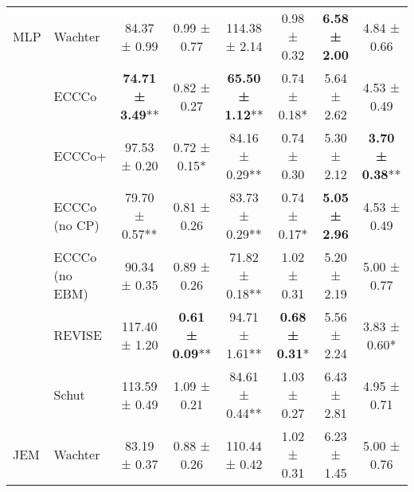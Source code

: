 \begin{table*}[t]
{\begin{tabular}[t]{llcccccc}
\multirow{-7}{*}{\raggedright\arraybackslash MLP} & Wachter & 84.37 ± 0.99\hphantom{*}\hphantom{*} & 0.99 ± 0.77\hphantom{*}\hphantom{*} & 114.38 ± 2.14\hphantom{*}\hphantom{*} & 0.98 ± 0.32\hphantom{*}\hphantom{*} & \textbf{6.58 ± 2.00}\hphantom{*}\hphantom{*} & 4.84 ± 0.66\hphantom{*}\hphantom{*}\\
\cmidrule{1-8}
 & ECCCo & \textbf{74.71 ± 3.49}** & 0.82 ± 0.27\hphantom{*}\hphantom{*} & \textbf{65.50 ± 1.12}** & 0.74 ± 0.18*\hphantom{*} & 5.64 ± 2.62\hphantom{*}\hphantom{*} & 4.53 ± 0.49\hphantom{*}\hphantom{*}\\

 & ECCCo+ & 97.53 ± 0.20\hphantom{*}\hphantom{*} & 0.72 ± 0.15*\hphantom{*} & 84.16 ± 0.29** & 0.74 ± 0.30\hphantom{*}\hphantom{*} & 5.30 ± 2.12\hphantom{*}\hphantom{*} & \textbf{3.70 ± 0.38}**\\

 & ECCCo (no CP) & 79.70 ± 0.57** & 0.81 ± 0.26\hphantom{*}\hphantom{*} & 83.73 ± 0.29** & 0.74 ± 0.17*\hphantom{*} & \textbf{5.05 ± 2.96}\hphantom{*}\hphantom{*} & 4.53 ± 0.49\hphantom{*}\hphantom{*}\\

 & ECCCo (no EBM) & 90.34 ± 0.35\hphantom{*}\hphantom{*} & 0.89 ± 0.26\hphantom{*}\hphantom{*} & 71.82 ± 0.18** & 1.02 ± 0.31\hphantom{*}\hphantom{*} & 5.20 ± 2.19\hphantom{*}\hphantom{*} & 5.00 ± 0.77\hphantom{*}\hphantom{*}\\

 & REVISE & 117.40 ± 1.20\hphantom{*}\hphantom{*} & \textbf{0.61 ± 0.09}** & 94.71 ± 1.61** & \textbf{0.68 ± 0.31}*\hphantom{*} & 5.56 ± 2.24\hphantom{*}\hphantom{*} & 3.83 ± 0.60*\hphantom{*}\\

 & Schut & 113.59 ± 0.49\hphantom{*}\hphantom{*} & 1.09 ± 0.21\hphantom{*}\hphantom{*} & 84.61 ± 0.44** & 1.03 ± 0.27\hphantom{*}\hphantom{*} & 6.43 ± 2.81\hphantom{*}\hphantom{*} & 4.95 ± 0.71\hphantom{*}\hphantom{*}\\

\multirow{-7}{*}{\raggedright\arraybackslash JEM} & Wachter & 83.19 ± 0.37\hphantom{*}\hphantom{*} & 0.88 ± 0.26\hphantom{*}\hphantom{*} & 110.44 ± 0.42\hphantom{*}\hphantom{*} & 1.02 ± 0.31\hphantom{*}\hphantom{*} & 6.23 ± 1.45\hphantom{*}\hphantom{*} & 5.00 ± 0.76\hphantom{*}\hphantom{*}\\
\bottomrule
\end{tabular}}
\end{table*}
